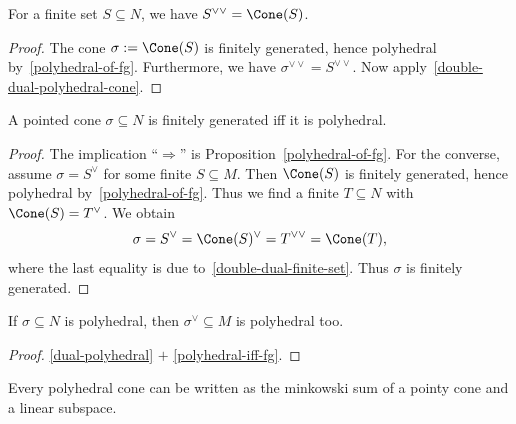 \begin{proposition}
  \label{double-dual-finite-set}
  \uses{}
  For a finite set \( S \subseteq N \), we have \( S^{\vee\vee} =
  \Cone(S) \).
\end{proposition}
\begin{proof}
  The cone \( \sigma := \Cone(S) \) is finitely generated, hence
  polyhedral by~\ref{polyhedral-of-fg}. Furthermore, we have \(
  \sigma^{\vee\vee} = S^{\vee\vee} \). Now
  apply~\ref{double-dual-polyhedral-cone}.
\end{proof}

\begin{proposition}[Polyhedral = Finitely generated]
  \label{polyhedral-iff-fg}
  \uses{}
  A pointed cone \( \sigma \subseteq N \) is finitely generated iff it is
  polyhedral.
\end{proposition}
\begin{proof}
  The implication ``\( \Rightarrow \)'' is
  Proposition~\ref{polyhedral-of-fg}. For the converse, assume
  \( \sigma = S^{\vee} \) for some finite \( S \subseteq M \). Then \(
  \Cone(S) \) is finitely generated, hence polyhedral
  by~\ref{polyhedral-of-fg}. Thus we find a finite \( T
  \subseteq N \) with \( \Cone(S) = T^\vee \). We obtain
  \[
      \sigma = S^{\vee} = \Cone(S)^\vee = T^{\vee\vee} = \Cone(T),
  \]
  where the last equality is due
  to~\ref{double-dual-finite-set}. Thus \( \sigma \) is finitely
  generated.
\end{proof}

\begin{proposition}
  \label{dual-polyhedral-cone}
  If \( \sigma \subseteq N \) is
  polyhedral, then \( \sigma^\vee \subseteq M \) is polyhedral too.
\end{proposition}
\begin{proof}
  \ref{dual-polyhedral} \( + \) \ref{polyhedral-iff-fg}.
\end{proof}

\begin{proposition}
  \label{pointy-linear-sum-polyhedral-cone}
  Every polyhedral cone can be written as the minkowski sum of a pointy cone and a linear subspace.
\end{proposition} %


